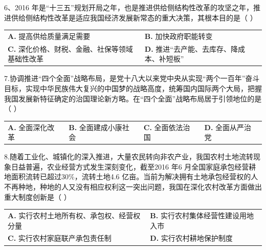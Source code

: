 \documentclass[UTF8,11pt]{ctexart}
\begin{document}
6、2016 年是“十三五”规划开局之年，也是推进供给侧结构性改革的攻坚之年，推进供给侧结构性改革是适应我国经济发展新常态的重大决策，其根本目的是（  ）


\begin{center}\begin{tabular}{>{\raggedright\arraybackslash}p{\dimexpr(\linewidth-4\tabcolsep)/2\relax}>{\raggedright\arraybackslash}p{\dimexpr(\linewidth-4\tabcolsep)/2\relax}}
\textbf{A.} 提高供给质量满足需要 & \textbf{B.} 加快政府职能转变\\[.35em]
\textbf{C.} 深化价格、财税、金融、社保等领域基础性改革 & \textbf{D.} 推进“去产能、去库存、降成本、补短板”\\[.35em]\end{tabular}\end{center}

7.协调推进“四个全面”战略布局，是党十八大以来党中央从实现“两个一百年”奋斗目标，实现中华民族伟大复兴的中国梦的战略高度，统筹国内国际两个大局，把握我国发展新特征确定的治国理论新方略。在“四个全面”战略布局居于引领地位的是（  ）


\begin{center}\begin{tabular}{>{\raggedright\arraybackslash}p{\dimexpr(\linewidth-8\tabcolsep)/4\relax}>{\raggedright\arraybackslash}p{\dimexpr(\linewidth-8\tabcolsep)/4\relax}>{\raggedright\arraybackslash}p{\dimexpr(\linewidth-8\tabcolsep)/4\relax}>{\raggedright\arraybackslash}p{\dimexpr(\linewidth-8\tabcolsep)/4\relax}}
\textbf{A.} 全面深化改革 & \textbf{B.} 全面建成小康社会 & \textbf{C.} 全面依法治国 & \textbf{D.} 全面从严治党\\[.35em]\end{tabular}\end{center}

8.随着工业化、城镇化的深入推进，大量农民转向非农产业，我国农村土地流转现象日益普遍，农业经营方式发生深刻变化，截至2016 年6 月全国家庭承包经营耕地面积流转已超过30\%，流转土地4.6 亿亩。当前为解决拥有土地承包经营权的人不再种地，种地的人又没有相应权利这一突出问题，我国在深化农村改革方面做出重大制度创新是（  ）


\begin{center}\begin{tabular}{>{\raggedright\arraybackslash}p{\dimexpr(\linewidth-4\tabcolsep)/2\relax}>{\raggedright\arraybackslash}p{\dimexpr(\linewidth-4\tabcolsep)/2\relax}}
\textbf{A.} 实行农村土地所有权、承包权、经营权分量 & \textbf{B.} 实行农村集体经营性建设用地入市\\[.35em]
\textbf{C.} 实行农村家庭联产承包责任制 & \textbf{D.} 实行农村耕地保护制度\\[.35em]\end{tabular}\end{center}
\end{document}
